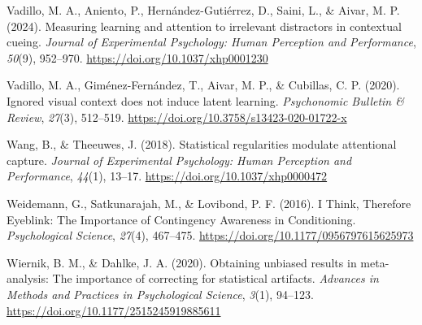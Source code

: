 \documentclass[
  jou,
  floatsintext,
  longtable,
  nolmodern,
  notxfonts,
  notimes,
  colorlinks=true,linkcolor=blue,citecolor=blue,urlcolor=blue]{apa7}
\newlength{\cslhangindent}
\newenvironment{CSLReferences}[2] %
 {\begin{list}{}{%
  \setlength{\itemindent}{0pt}
  \setlength{\leftmargin}{0pt}
  \setlength{\parsep}{0pt}
  \ifodd #1
   \setlength{\leftmargin}{\cslhangindent}
   \setlength{\itemindent}{-1\cslhangindent}
  \fi
  \setlength{\itemsep}{#2\baselineskip}}}
 {\end{list}}
\begin{document}
\begin{CSLReferences}{1}{0}
Vadillo, M. A., Aniento, P., Hernández-Gutiérrez, D., Saini, L., \&
Aivar, M. P. (2024). Measuring learning and attention to irrelevant
distractors in contextual cueing. \emph{Journal of Experimental
Psychology: Human Perception and Performance}, \emph{50}(9), 952--970.
\url{https://doi.org/10.1037/xhp0001230}

Vadillo, M. A., Giménez-Fernández, T., Aivar, M. P., \& Cubillas, C. P.
(2020). Ignored visual context does not induce latent learning.
\emph{Psychonomic Bulletin \& Review}, \emph{27}(3), 512--519.
\url{https://doi.org/10.3758/s13423-020-01722-x}

Wang, B., \& Theeuwes, J. (2018). Statistical regularities modulate
attentional capture. \emph{Journal of Experimental Psychology: Human
Perception and Performance}, \emph{44}(1), 13--17.
\url{https://doi.org/10.1037/xhp0000472}

Weidemann, G., Satkunarajah, M., \& Lovibond, P. F. (2016). I Think,
Therefore Eyeblink: The Importance of Contingency Awareness in
Conditioning. \emph{Psychological Science}, \emph{27}(4), 467--475.
\url{https://doi.org/10.1177/0956797615625973}

Wiernik, B. M., \& Dahlke, J. A. (2020). Obtaining unbiased results in
meta-analysis: The importance of correcting for statistical artifacts.
\emph{Advances in Methods and Practices in Psychological Science},
\emph{3}(1), 94--123. \url{https://doi.org/10.1177/2515245919885611}

\end{CSLReferences}
\end{document}
